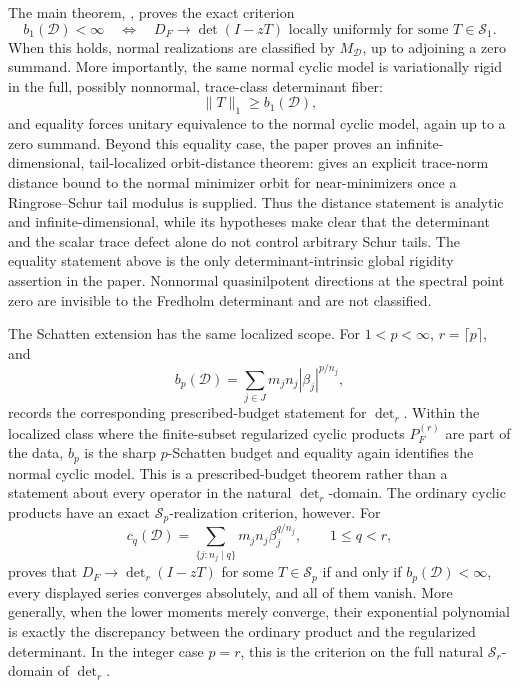 The main theorem, , proves the exact
criterion
\[
  b_1(\mathcal D)<\infty
  \quad\Longleftrightarrow\quad
  D_F\longrightarrow\det(I-zT)
  \text{ locally uniformly for some }T\in\mathcal S_1.
\]
When this holds, normal realizations are classified by
\(M_{\mathcal D}\), up to adjoining a zero summand.  More importantly, the same
normal cyclic model is variationally rigid in the full, possibly nonnormal,
trace-class determinant fiber:
\[
  \|T\|_1\ge b_1(\mathcal D),
\]
and equality forces unitary equivalence to the normal cyclic model, again up to
a zero summand.  Beyond this equality case, the paper proves an
infinite-dimensional, tail-localized orbit-distance theorem:
 gives an explicit trace-norm distance
bound to the normal minimizer orbit for near-minimizers once a Ringrose--Schur
tail modulus is supplied.  Thus the distance statement is analytic and
infinite-dimensional, while its hypotheses make clear that the determinant and
the scalar trace defect alone do not control arbitrary Schur tails.
The equality statement above is the only determinant-intrinsic global rigidity
assertion in the paper.
Nonnormal quasinilpotent directions at the spectral point zero are invisible to
the Fredholm determinant and are not classified.

The Schatten extension has the same localized scope.  For
\(1<p<\infty\), \(r=\lceil p\rceil\), and
\[
  b_p(\mathcal D)=\sum_{j\in J}m_jn_j|\beta_j|^{p/n_j},
\]
 records the corresponding
prescribed-budget statement for \(\det_r\).  Within the localized class where
the finite-subset regularized cyclic products \(P_F^{(r)}\) are part of the data,
\(b_p\) is the sharp
\(p\)-Schatten budget and equality again identifies the normal cyclic model.
This is a prescribed-budget theorem rather than a statement about every
operator in the natural \(\det_r\)-domain.  The ordinary cyclic products have
an exact \(\mathcal S_p\)-realization criterion, however.  For
\[
  c_q(\mathcal D)
  =\sum_{\{j:n_j\mid q\}}m_jn_j\beta_j^{q/n_j},
  \qquad 1\le q<r,
\]
 proves that
\(D_F\to\det_r(I-zT)\) for some \(T\in\mathcal S_p\) if and only if
\(b_p(\mathcal D)<\infty\), every displayed series converges absolutely, and
all of them vanish.  More generally, when the lower moments merely converge,
their exponential polynomial is exactly the discrepancy between the ordinary
product and the regularized determinant.  In the integer case \(p=r\), this is
the criterion on the full natural \(\mathcal S_r\)-domain of \(\det_r\).

